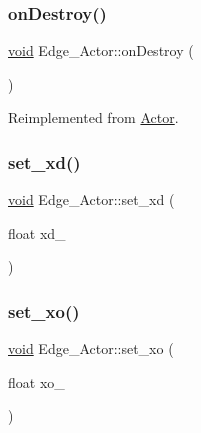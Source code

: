 \mbox{\label{classEdge__Actor_ae7a429d48b86442154c93eb65bc8b22d}} 
\subsubsection{\texorpdfstring{on\+Destroy()}{onDestroy()}}
{\footnotesize\ttfamily \hyperlink{imgui__impl__opengl3__loader_8h_ac668e7cffd9e2e9cfee428b9b2f34fa7}{void} Edge\+\_\+\+Actor\+::on\+Destroy (\begin{DoxyParamCaption}{ }\end{DoxyParamCaption})\hspace{0.3cm}{\ttfamily [virtual]}}



Reimplemented from \hyperlink{classActor_a47101d6275509662bf6c84c3f3439696}{Actor}.

\mbox{\label{classEdge__Actor_a65bfa5124e666e68fb2a3b1aae8bc203}} 
\subsubsection{\texorpdfstring{set\+\_\+xd()}{set\_xd()}}
{\footnotesize\ttfamily \hyperlink{imgui__impl__opengl3__loader_8h_ac668e7cffd9e2e9cfee428b9b2f34fa7}{void} Edge\+\_\+\+Actor\+::set\+\_\+xd (\begin{DoxyParamCaption}\item[{float}]{xd\+\_\+ }\end{DoxyParamCaption})\hspace{0.3cm}{\ttfamily [inline]}}

\mbox{\label{classEdge__Actor_a4494e28b1ac2a197243f6ad6f76955f9}} 
\subsubsection{\texorpdfstring{set\+\_\+xo()}{set\_xo()}}
{\footnotesize\ttfamily \hyperlink{imgui__impl__opengl3__loader_8h_ac668e7cffd9e2e9cfee428b9b2f34fa7}{void} Edge\+\_\+\+Actor\+::set\+\_\+xo (\begin{DoxyParamCaption}\item[{float}]{xo\+\_\+ }\end{DoxyParamCaption})\hspace{0.3cm}{\ttfamily [inline]}}

